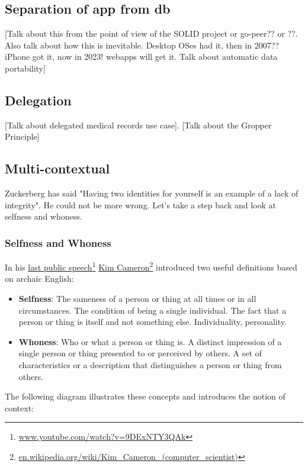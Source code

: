 \documentclass[11pt, oneside]{article}   	%
\newcommand{\hyperfootnote}[1][]{\def\ArgI{{#1}}\hyperfootnoteRelay}
\newcommand\hyperfootnoteRelay[2][]{\href{#1#2}{\ArgI}\footnote{\href{#1#2}{#2}}}
\begin{document}
\subsection{Separation of app from db}

[Talk about this from the point of view of the SOLID project or go-peer?? or ??. Also talk about how this is inevitable. Desktop OSes had it, then in 2007?? iPhone got it, now in 2023! webapps will get it. Talk about automatic data portability]

\subsection{Delegation}

[Talk about delegated medical records use case]. [Talk about the Gropper Principle]

\subsection{Multi-contextual}

Zuckerberg has said "Having two identities for yourself is an example of a lack of integrity"\cite{Kirkpatrick2011}. He could not be more wrong. Let's take a step back and look at selfness and whoness. 

\subsubsection{Selfness and Whoness}

In his \hyperfootnote[last public speech][https://]{www.youtube.com/watch?v=9DExNTY3QAk}  
\hyperfootnote[Kim Cameron][https://]{en.wikipedia.org/wiki/Kim\_Cameron\_(computer\_scientist)} introduced two useful definitions based on archaic English:

\begin{itemize}
\item \textbf{Selfness}: The sameness of a person or thing at all times or in all circumstances. The condition of being a single individual. The fact that a person or thing is itself and not something else. Individuality, personality. 
\item \textbf{Whoness}: Who or what a person or thing is. A distinct impression of a single person or thing presented to or perceived by others. A set of characteristics or a description that distinguishes a person or thing from others. 
\end{itemize}

The following diagram illustrates these concepts and introduces the notion of context:
\end{document}

